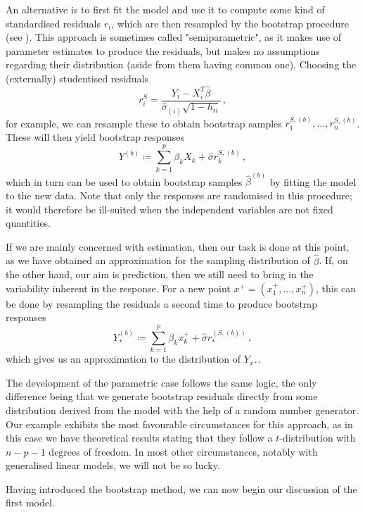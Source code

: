 \documentclass[a4paper]{book}
\theoremstyle{plain}
\begin{document}
An alternative is to first fit the model and use it to compute some kind of standardised residuals $r_i$, which are then resampled by the bootstrap procedure (see \cite[Algorithm 6.1]{davison}). This approach is sometimes called "semiparametric", as it makes use of parameter estimates to produce the residuals, but makes no assumptions regarding their distribution (aside from them having common one). Choosing the (externally) studentised residuals
\begin{equation}
    r^S_i = \frac{Y_i - X^T_i \hat{\beta}}{\hat{\sigma}_{(i)} \sqrt{1 - h_{ii}}} \,,
\end{equation}
for example, we can resample these to obtain bootstrap samples $r^{S, (b)}_1, \dots, r^{S, (b)}_n$. These will then yield bootstrap responses
\begin{equation}
    Y^{(b)} \coloneqq \sum_{k=1}^p \beta_k X_k + \hat{\sigma} r^{S, (b)}_k \,,
\end{equation}
which in turn can be used to obtain bootstrap samples $\hat{\beta}^{(b)}$ by fitting the model to the new data. Note that only the responses are randomised in this procedure; it would therefore be ill-suited when the independent variables are not fixed quantities. 

If we are mainly concerned with estimation, then our task is done at this point, as we have obtained an approximation for the sampling distribution of $\hat{\beta}$. If, on the other hand, our aim is prediction, then we still need to bring in the variability inherent in the response. For a new point $x^+ = (x^+_1, \dots, x^+_n)$, this can be done by resampling the residuals a second time to produce bootstrap responses
\begin{equation}
    Y_*^{(b)} \coloneqq \sum_{k=1}^p \beta_k x^+_k + \hat{\sigma} r_*^{(S, (b))} \,,
\end{equation}
which gives us an approximation to the distribution of $Y_{x^+}$.

The development of the parametric case follows the same logic, the only difference being that we generate bootstrap residuals directly from some distribution derived from the model with the help of a random number generator. Our example exhibits the most favourable circumstances for this approach, as in this case we have theoretical results stating that they follow a $t$-distribution with $n - p - 1$ degrees of freedom. In most other circumstances, notably with generalised linear models, we will not be so lucky.

Having introduced the bootstrap method, we can now begin our discussion of the first model.
\end{document}
